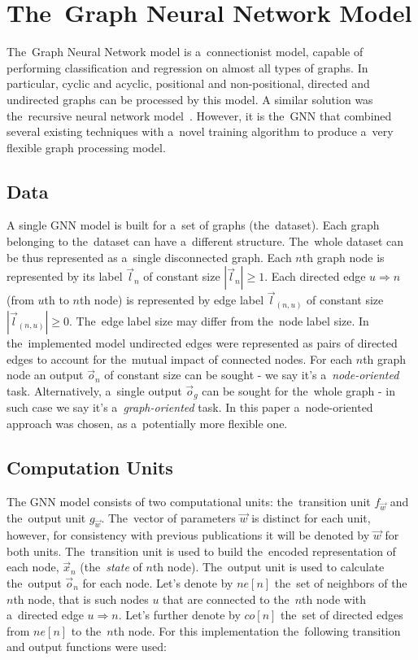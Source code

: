 \documentclass{llncs}
\begin{document}
\section{The~Graph Neural Network Model}
The~Graph Neural Network model is a~connectionist model, capable of performing classification and regression on almost all types of graphs\cite{scarselli2009graph}. In particular, cyclic and acyclic, positional and non-positional, directed and undirected graphs can be processed by this model. A similar solution was the~recursive neural network model~\cite{bianchini2005recursive}. However, it is the~GNN that combined several existing techniques with a~novel training algorithm to produce a~very flexible graph processing model.

\subsection{Data}
A single GNN model is built for a~set of graphs (the~dataset). Each graph belonging to the~dataset can have a~different structure. The~whole dataset can be thus represented as a~single disconnected graph. Each $n$th graph node is represented by its label $\vec{l}_n$ of constant size $|\vec{l}_n| \geq 1$. Each directed edge $u \Rightarrow n$ (from $u$th to $n$th node) is represented by edge label $\vec{l}_{(n,u)}$ of constant size $|\vec{l}_{(n,u)}| \geq 0$. The~edge label size may differ from the~node label size. In the~implemented model undirected edges were represented as pairs of directed edges to account for the~mutual impact of connected nodes. For each $n$th graph node an output $\vec{o}_n$ of constant size can be sought - we say it's a~\emph{node-oriented} task. Alternatively, a~single output $\vec{o}_g$ can be sought for the~whole graph - in such case we say it's a~\emph{graph-oriented} task. In this paper a~node-oriented approach was chosen, as a~potentially more flexible one.

\subsection{Computation Units}
\noindent The GNN model consists of two computational units: the~transition unit $f_{\vec{w}}$ and the~output unit $g_{\vec{w}}$. The~vector of parameters $\vec{w}$ is distinct for each unit, however, for consistency with previous publications it will be denoted by $\vec{w}$ for both units. The~transition unit is used to build the~encoded representation of each node, $\vec{x}_n$ (the~\emph{state} of $n$th node). The~output unit is used to calculate the~output $\vec{o}_n$ for each node. Let's denote by $ne[n]$ the~set of neighbors of the~$n$th node, that is such nodes $u$ that are connected to the~$n$th node with a~directed edge $u \Rightarrow n$. Let's further denote by $co[n]$ the~set of directed edges from $ne[n]$ to the~$n$th node. For this implementation the~following transition and output functions were used:
\end{document}
